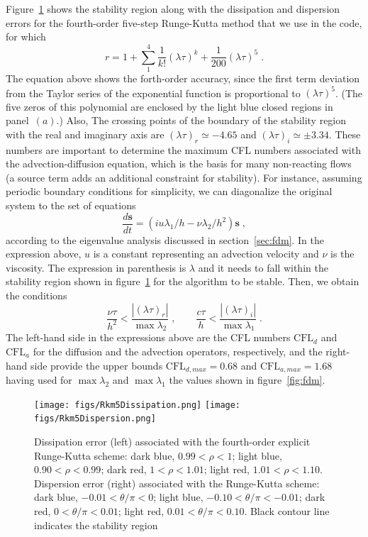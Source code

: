 {Figure~\ref{fig:rkm} shows the stability region along with the dissipation and
dispersion errors for the fourth-order five-step Runge-Kutta method that we use
in the code, for which
\begin{equation}
  r=1+\sum_1^4\frac{1}{k!}(\lambda \tau)^k+\frac{1}{200}(\lambda \tau)^5 \;.
\end{equation}
The equation above shows the forth-order accuracy, since the first term
deviation from the Taylor series of the exponential function is proportional to
$(\lambda\tau)^5$. (The five zeros of this polynomial are enclosed by the light
blue closed regions in panel~$(a)$.) Also, The crossing points of the boundary
of the stability region with the real and imaginary axis are $(\lambda
\tau)_{r}\simeq-4.65$ and $(\lambda \tau)_{i}\simeq\pm 3.34$. These numbers are
important to determine the maximum CFL numbers associated with the 
advection-diffusion equation, which is the basis for many non-reacting flows (a
source term adds an additional constraint for stability). For instance, assuming
periodic boundary conditions for simplicity, we can diagonalize the original
system to the set of equations
\begin{equation}
  \frac{d\mathbf{s}}{dt}=(iu\lambda_1/h -\nu\lambda_2/h^2)\mathbf{s} \;,
\end{equation}
according to the eigenvalue analysis discussed in section~\ref{sec:fdm}. In the
expression above, $u$ is a constant representing an advection velocity and $\nu$
is the viscosity.  The expression in parenthesis is $\lambda$ and it needs to
fall within the stability region shown in figure~\ref{fig:rkm} for the algorithm
to be stable. Then, we obtain the conditions
\begin{equation}
  \frac{\nu\tau}{h^2}<\frac{|(\lambda \tau)_{r}|}{\max{\lambda_2}}\;,\qquad
  \frac{c\tau}{h}<\frac{|(\lambda \tau)_{i}|}{\max{\lambda_1}} \;.
\end{equation}
The left-hand side in the expressions above are the CFL numbers $\textrm{CFL}_d$
and $\textrm{CFL}_a$ for the diffusion and the advection operators,
respectively, and the right-hand side provide the upper bounds
$\textrm{CFL}_{d,max}=0.68$ and $\textrm{CFL}_{a,max}=1.68$ having used for
$\max{\lambda_2}$ and $\max{\lambda_1}$ the values shown in
figure~\ref{fig:fdm}.

\begin{figure}
\texttt{[image: figs/Rkm5Dissipation.png]}\hfill
\texttt{[image: figs/Rkm5Dispersion.png]}
\caption{Dissipation error (left) associated with the fourth-order explicit
  Runge-Kutta scheme: dark blue, $0.99<\rho<1$; light blue, $0.90<\rho<0.99$;
  dark red, $1<\rho<1.01$; light red, $1.01<\rho<1.10$. Dispersion error (right)
  associated with the Runge-Kutta scheme: dark blue, $-0.01<\theta/\pi<0$; light
  blue, $-0.10<\theta/\pi<-0.01$; dark red, $0<\theta/\pi<0.01$; light red,
  $0.01<\theta/\pi<0.10$. Black contour line indicates the stability
  region}\label{fig:rkm}
\end{figure}

}
